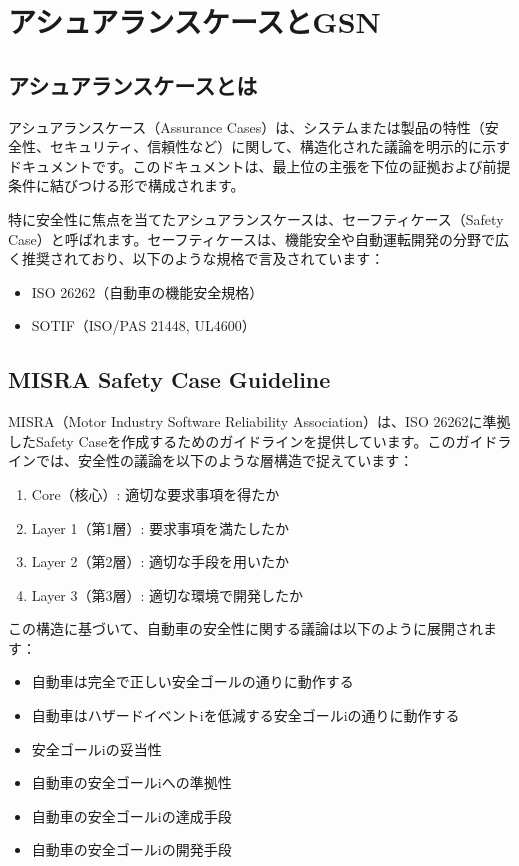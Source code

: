 \chapter{アシュアランスケースとGSN}
\label{chap5}



\section{アシュアランスケースとは}

アシュアランスケース（Assurance Cases）は、システムまたは製品の特性（安全性、セキュリティ、信頼性など）に関して、構造化された議論を明示的に示すドキュメントです。このドキュメントは、最上位の主張を下位の証拠および前提条件に結びつける形で構成されます。

特に安全性に焦点を当てたアシュアランスケースは、セーフティケース（Safety Case）と呼ばれます。セーフティケースは、機能安全や自動運転開発の分野で広く推奨されており、以下のような規格で言及されています：

\begin{itemize}
    \item ISO 26262（自動車の機能安全規格）
    \item SOTIF（ISO/PAS 21448, UL4600）
\end{itemize}

\section{MISRA Safety Case Guideline}

MISRA（Motor Industry Software Reliability Association）は、ISO 26262に準拠したSafety Caseを作成するためのガイドラインを提供しています。このガイドラインでは、安全性の議論を以下のような層構造で捉えています：

\begin{enumerate}
    \item Core（核心）: 適切な要求事項を得たか
    \item Layer 1（第1層）: 要求事項を満たしたか
    \item Layer 2（第2層）: 適切な手段を用いたか
    \item Layer 3（第3層）: 適切な環境で開発したか
\end{enumerate}

この構造に基づいて、自動車の安全性に関する議論は以下のように展開されます：

\begin{itemize}
    \item 自動車は完全で正しい安全ゴールの通りに動作する
    \item 自動車はハザードイベントiを低減する安全ゴールiの通りに動作する
    \item 安全ゴールiの妥当性
    \item 自動車の安全ゴールiへの準拠性
    \item 自動車の安全ゴールiの達成手段
    \item 自動車の安全ゴールiの開発手段
\end{itemize}



